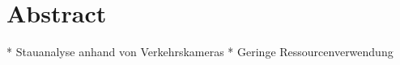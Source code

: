 \chapter*{Abstract} %
* Stauanalyse anhand von Verkehrskameras\newline
* Geringe Ressourcenverwendung\newline
